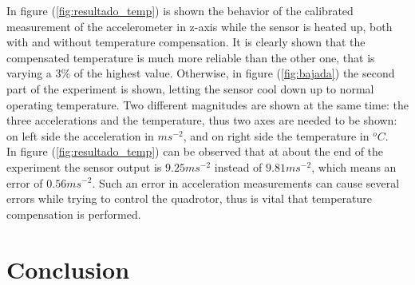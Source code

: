 \documentclass[conference]{IEEEtran}
\newcommand{\refp}[1]{(\ref{#1})}
\begin{document}
In figure \refp{fig:resultado_temp} is shown the behavior of the calibrated measurement of the accelerometer in z-axis while the sensor is heated up, both with and without temperature compensation. It is clearly shown that the compensated temperature is much more reliable than the other one, that is varying a 3\% of the highest value. Otherwise, in figure \refp{fig:bajada} the second part of the experiment is shown, letting the sensor cool down up to normal operating temperature. Two different magnitudes are shown at the same time: the three accelerations and the temperature, thus two axes are needed to be shown: on left side the acceleration in $ms^{-2}$, and on right side the temperature in $^oC$.\\
In figure \refp{fig:resultado_temp} can be observed that at about the end of the experiment the sensor output is $9.25ms^{-2}$ instead of $9.81ms^{-2}$, which means an error of $0.56ms^{-2}$. Such an error in acceleration measurements can cause several errors while trying to control the quadrotor, thus is vital that temperature compensation is performed.


\section{Conclusion}




%
%
%
 



\end{document}
